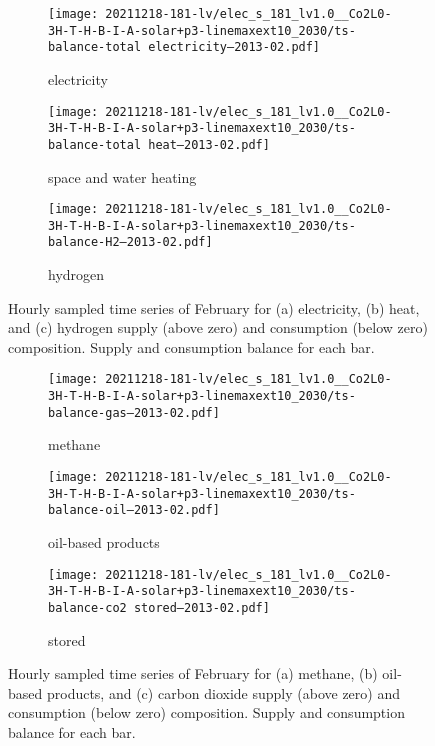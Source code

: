 \begin{figure}
    \centering
    \begin{subfigure}[t]{\textwidth}
        \centering
        \caption{electricity}
        \texttt{[image: 20211218-181-lv/elec\_s\_181\_lv1.0\_\_Co2L0-3H-T-H-B-I-A-solar+p3-linemaxext10\_2030/ts-balance-total electricity--2013-02.pdf]}
    \end{subfigure}
    \begin{subfigure}[t]{\textwidth}
        \centering
        \caption{space and water heating}
        \texttt{[image: 20211218-181-lv/elec\_s\_181\_lv1.0\_\_Co2L0-3H-T-H-B-I-A-solar+p3-linemaxext10\_2030/ts-balance-total heat--2013-02.pdf]}
    \end{subfigure}
    \begin{subfigure}[t]{\textwidth}
        \centering
        \caption{hydrogen}
        \texttt{[image: 20211218-181-lv/elec\_s\_181\_lv1.0\_\_Co2L0-3H-T-H-B-I-A-solar+p3-linemaxext10\_2030/ts-balance-H2--2013-02.pdf]}
    \end{subfigure}
    \caption{Hourly sampled time series of February for (a) electricity, (b) heat, and (c) hydrogen supply (above zero) and consumption (below zero) composition. Supply and consumption balance for each bar.}
    \label{fig:output-ts-3}
\end{figure}

\begin{figure}
    \centering
    \begin{subfigure}[t]{\textwidth}
        \centering
        \caption{methane}
        \texttt{[image: 20211218-181-lv/elec\_s\_181\_lv1.0\_\_Co2L0-3H-T-H-B-I-A-solar+p3-linemaxext10\_2030/ts-balance-gas--2013-02.pdf]}
    \end{subfigure}
    \begin{subfigure}[t]{\textwidth}
        \centering
        \caption{oil-based products}
        \texttt{[image: 20211218-181-lv/elec\_s\_181\_lv1.0\_\_Co2L0-3H-T-H-B-I-A-solar+p3-linemaxext10\_2030/ts-balance-oil--2013-02.pdf]}
    \end{subfigure}
    \begin{subfigure}[t]{\textwidth}
        \centering
        \caption{stored \co}
        \texttt{[image: 20211218-181-lv/elec\_s\_181\_lv1.0\_\_Co2L0-3H-T-H-B-I-A-solar+p3-linemaxext10\_2030/ts-balance-co2 stored--2013-02.pdf]}
    \end{subfigure}
    \caption{Hourly sampled time series of February for (a) methane, (b) oil-based products, and (c) carbon dioxide supply (above zero) and consumption (below zero) composition. Supply and consumption balance for each bar.}
    \label{fig:output-ts-4}
\end{figure}

